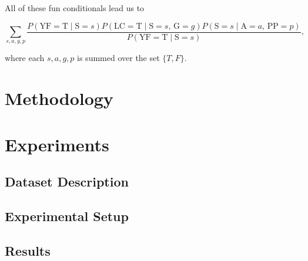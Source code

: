 \documentclass{article}
\begin{document}
All of these fun conditionals lead us to

\begin{equation*}
    \sum_{s,a,g,p}\frac{P(\text{YF} =\text{T}\;|\; \text{S} = s) P(\text{LC} 
    = \text{T}\;|\; \text{S}=s,\, \text{G}=g) P(\text{S}=s\;|\;\text{A}=a,\, \text{PP}=p)}
    {P(\text{YF} = \text{T}\;|\; \text{S} = s)},
\end{equation*}

where each $s,a,g,p$ is summed over the set $\{T, F\}$.


\section{Methodology}


\section{Experiments}


\subsection{Dataset Description}


\subsection{Experimental Setup}


\subsection{Results}

\end{document}
